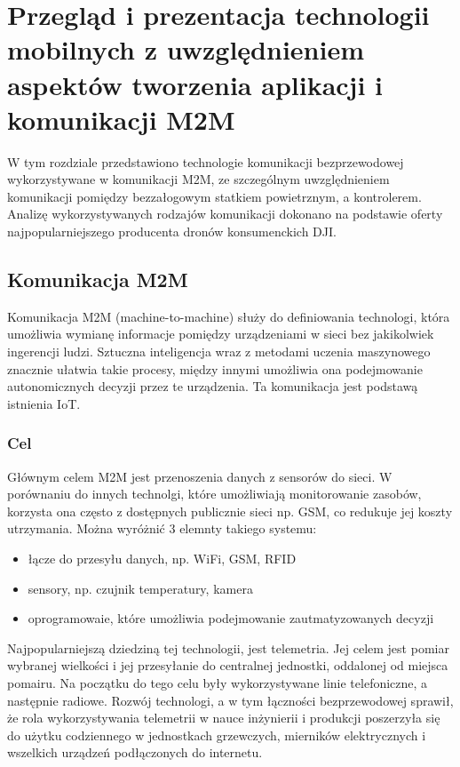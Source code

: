 \newpage 
\section{Przegląd i prezentacja technologii mobilnych z uwzględnieniem aspektów tworzenia aplikacji i komunikacji M2M}
\hspace{1cm}W tym rozdziale przedstawiono technologie komunikacji bezprzewodowej wykorzystywane w komunikacji M2M, ze szczególnym uwzględnieniem komunikacji pomiędzy bezzałogowym statkiem powietrznym, a kontrolerem. Analizę wykorzystywanych rodzajów komunikacji dokonano na podstawie oferty najpopularniejszego producenta dronów konsumenckich DJI.

\subsection{Komunikacja M2M}
\hspace{1cm}Komunikacja M2M (machine-to-machine) służy do definiowania technologi, która umożliwia wymianę informacje pomiędzy urządzeniami w sieci bez jakikolwiek ingerencji ludzi. Sztuczna inteligencja wraz z metodami uczenia maszynowego znacznie ułatwia takie procesy, między innymi umożliwia ona podejmowanie autonomicznych decyzji przez te urządzenia. Ta komunikacja jest podstawą istnienia IoT.\cite{m2m-web}

\subsubsection{Cel}
\hspace{1cm}Głównym celem M2M jest przenoszenia danych z sensorów do sieci. W porównaniu do innych technolgi, które umożliwiają monitorowanie zasobów, korzysta ona często z dostępnych publicznie sieci np. GSM, co redukuje jej koszty utrzymania. Można wyróżnić 3 elemnty takiego systemu:
\begin{itemize}
  \item łącze do przesyłu danych, np. WiFi, GSM, RFID
  \item sensory, np. czujnik temperatury, kamera
  \item oprogramowaie, które umożliwia podejmowanie zautmatyzowanych decyzji
\end{itemize}
\hspace{1cm}Najpopularniejszą dziedziną tej technologii, jest telemetria. Jej celem jest pomiar wybranej wielkości i jej przesyłanie do centralnej jednostki, oddalonej od miejsca pomairu. Na początku do tego celu były wykorzystywane linie telefoniczne, a następnie radiowe. Rozwój technologi, a w tym łączności bezprzewodowej sprawił, że rola wykorzystywania telemetrii w nauce inżynierii i produkcji poszerzyła się do użytku codziennego w jednostkach grzewczych, mierników elektrycznych i wszelkich urządzeń podłączonych do internetu.\cite{m2m-web}

